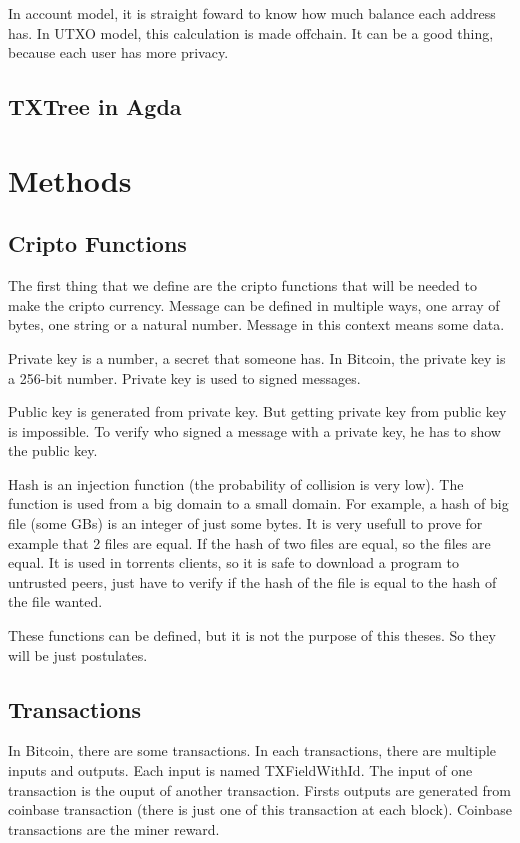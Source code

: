 \documentclass[12pt]{article}
\newcommand{\agda}[2]{\ExecuteMetaData[latex/#1.tex]{#2}}
\begin{document}
In account model, it is straight foward to know how much balance each address has.
In UTXO model, this calculation is made offchain. It can be a good thing,
because each user has more privacy.

\subsection{TXTree in Agda}

\section{Methods}

\subsection{Cripto Functions}
The first thing that we define are the cripto functions that will be needed to make the cripto currency.
Message can be defined in multiple ways, one array of bytes, one string or a natural number.
Message in this context means some data.

Private key is a number, a secret that someone has.
In Bitcoin, the private key is a 256-bit number.
Private key is used to signed messages.

Public key is generated from private key.
But getting private key from public key is impossible.
To verify who signed a message with a private key, he has to show the public key.

Hash is an injection function (the probability of collision is very low).
The function is used from a big domain to a small domain.
For example, a hash of big file (some GBs) is an integer of just some bytes.
It is very usefull to prove for example that 2 files are equal.
If the hash of two files are equal, so the files are equal.
It is used in torrents clients, so it is safe to download a program to untrusted peers,
just have to verify if the hash of the file is equal to the hash of the file wanted.

These functions can be defined, but it is not the purpose of this theses.
So they will be just postulates.

\agda{Cripto}{criptoPostulates}

\subsection{Transactions}

In Bitcoin, there are some transactions.
In each transactions, there are multiple inputs and outputs.
Each input is named TXFieldWithId.
The input of one transaction is the ouput of another transaction.
Firsts outputs are generated from coinbase transaction (there is just one of this transaction at each block).
Coinbase transactions are the miner reward.
\end{document}
